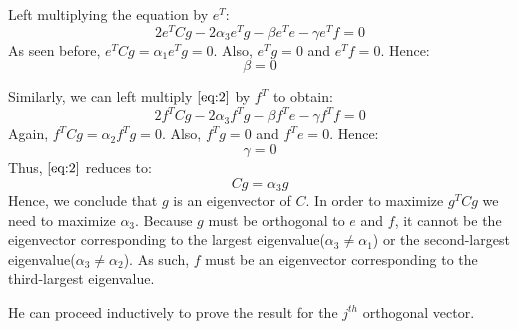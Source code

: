 \documentclass[a4paper]{article}
\begin{document}
Left multiplying the equation by $e^{T}$:
\[2e^{T}Cg - 2\alpha_{3}e^{T}g - \beta e^{T}e - \gamma e^{T}f = 0\]
As seen before, $e^{T}Cg = \alpha_{1}e^{T}g = 0$. Also, $e^{T}g = 0$ and $e^{T}f = 0$. Hence:
\[\beta = 0\]

Similarly, we can left multiply  $\eqref{eq:2}$ by $f^{T}$ to obtain:
\[2f^{T}Cg - 2\alpha_{3}f^{T}g - \beta f^{T}e - \gamma f^{T}f = 0\]
Again, $f^{T}Cg = \alpha_{2}f^{T}g = 0$. Also, $f^{T}g = 0$ and $f^{T}e = 0$. Hence:
\[\gamma = 0\]
Thus, $\eqref{eq:2}$ reduces to:
\[Cg = \alpha_{3}g\]
Hence, we conclude that $g$ is an eigenvector of $C$. In order to maximize $g^{T}Cg$ we need to maximize $\alpha_3$. Because $g$ must be orthogonal to $e$ and $f$, it cannot be the eigenvector corresponding to the largest eigenvalue($\alpha_{3} \neq \alpha_{1}$) or the second-largest eigenvalue($\alpha_{3} \neq \alpha_{2}$). As such, $f$ must be an eigenvector corresponding to the third-largest eigenvalue.

He can proceed inductively to prove the result for the $j^{th}$ orthogonal vector.
\end{document}
